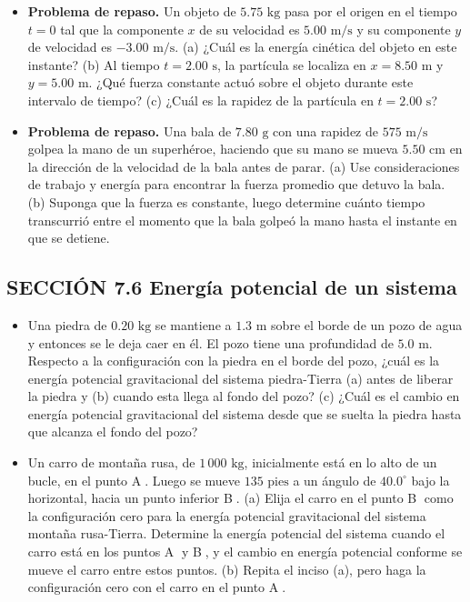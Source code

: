 \documentclass[11pt,a4paper]{article}
\begin{document}
\begin{itemize}
    \item[\textbf{27.}] \textbf{Problema de repaso.} Un objeto de $5.75 \text{ kg}$ pasa por el origen en el tiempo $t = 0$ tal que la componente $x$ de su velocidad es $5.00 \text{ m/s}$ y su componente $y$ de velocidad es $-3.00 \text{ m/s}$. (a) ¿Cuál es la energía cinética del objeto en este instante? (b) Al tiempo $t = 2.00 \text{ s}$, la partícula se localiza en $x = 8.50 \text{ m}$ y $y = 5.00 \text{ m}$. ¿Qué fuerza constante actuó sobre el objeto durante este intervalo de tiempo? (c) ¿Cuál es la rapidez de la partícula en $t = 2.00 \text{ s}$?
    \vspace*{7cm}

    \item[\textbf{28.}] \textbf{Problema de repaso.} Una bala de $7.80 \text{ g}$ con una rapidez de $575 \text{ m/s}$ golpea la mano de un superhéroe, haciendo que su mano se mueva $5.50 \text{ cm}$ en la dirección de la velocidad de la bala antes de parar. (a) Use consideraciones de trabajo y energía para encontrar la fuerza promedio que detuvo la bala. (b) Suponga que la fuerza es constante, luego determine cuánto tiempo transcurrió entre el momento que la bala golpeó la mano hasta el instante en que se detiene.
    \vspace*{6cm}
\end{itemize}

\newpage

\subsection*{SECCIÓN 7.6 Energía potencial de un sistema}

\begin{itemize}
    \item[\textbf{29.}] Una piedra de $0.20 \text{ kg}$ se mantiene a $1.3 \text{ m}$ sobre el borde de un pozo de agua y entonces se le deja caer en él. El pozo tiene una profundidad de $5.0 \text{ m}$. Respecto a la configuración con la piedra en el borde del pozo, ¿cuál es la energía potencial gravitacional del sistema piedra-Tierra (a) antes de liberar la piedra y (b) cuando esta llega al fondo del pozo? (c) ¿Cuál es el cambio en energía potencial gravitacional del sistema desde que se suelta la piedra hasta que alcanza el fondo del pozo?
    \vspace*{6cm}

    \item[\textbf{30.}] Un carro de montaña rusa, de $1\,000 \text{ kg}$, inicialmente está en lo alto de un bucle, en el punto \textcircled{A}. Luego se mueve $135 \text{ pies}$ a un ángulo de $40.0^\circ$ bajo la horizontal, hacia un punto inferior \textcircled{B}. (a) Elija el carro en el punto \textcircled{B} como la configuración cero para la energía potencial gravitacional del sistema montaña rusa-Tierra. Determine la energía potencial del sistema cuando el carro está en los puntos \textcircled{A} y \textcircled{B}, y el cambio en energía potencial conforme se mueve el carro entre estos puntos. (b) Repita el inciso (a), pero haga la configuración cero con el carro en el punto \textcircled{A}.
    \vspace*{6cm}
\end{itemize}
\end{document}
